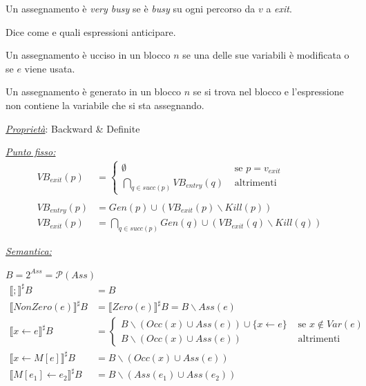 \documentclass[a4paper, 10pt]{book}
\begin{document}
\noindent
Un assegnamento è \textit{very busy} se è \textit{busy} su ogni percorso da $v$ a \textit{exit}.

\noindent
Dice come e quali espressioni anticipare.

\noindent
Un assegnamento è ucciso in un blocco $n$ se una delle sue variabili è modificata o se $e$ viene usata.

\noindent
Un assegnamento è generato in un blocco $n$ se si trova nel blocco e l'espressione non contiene la variabile che si sta assegnando.
\newline

\noindent
\textit{\underline{Proprietà}}: Backward \& Definite
\newline

\noindent
\underline{\textit{Punto fisso:}}
\begin{align*}
	VB_{exit}(p) &= 
	\begin{cases}
		\emptyset &\text{ se } p = v_{exit} \\
		\bigcap_{q\in succ(p)} VB_{entry}(q) &\text{ altrimenti}
	\end{cases}\\ \\
	VB_{entry}(p) &= Gen(p) \cup (VB_{exit}(p)\backslash Kill(p))\\
	VB_{exit}(p) &= \bigcap_{q\in succ(p)} Gen(q) \cup (VB_{exit}(q)\backslash Kill(q))
\end{align*}

\noindent
\underline{\textit{Semantica:}}

$B = 2^{Ass} = \mathcal{P}(Ass)$
\begin{align*}
	\llbracket ; \rrbracket^\sharp B &= B\\
	\llbracket NonZero(e) \rrbracket^\sharp B &= \llbracket Zero(e) \rrbracket^\sharp B = B \backslash Ass(e)\\
	\llbracket x\leftarrow e \rrbracket^\sharp B &= \begin{cases}
		B\backslash (Occ(x) \cup Ass(e)) \cup \{x\leftarrow e \} &\text{ se } x\notin Var(e) \\
		B\backslash (Occ(x) \cup Ass(e)) &\text{ altrimenti}
	\end{cases}\\
	\llbracket x\leftarrow M[e] \rrbracket^\sharp B &= B\backslash (Occ(x) \cup Ass(e))\\
	\llbracket M[e_1]\leftarrow e_2 \rrbracket^\sharp B &= B\backslash (Ass(e_1) \cup Ass(e_2))
\end{align*}
\end{document}
